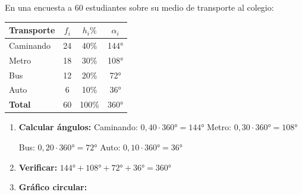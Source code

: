\documentclass[11pt, letterpaper]{article}
\begin{document}
\begin{tcolorbox}[examplebox, title={Ej. 6. Gráfico circular y polígono de frecuencias}]
En una encuesta a 60 estudiantes sobre su medio de transporte al colegio:

\begin{center}
\renewcommand{\arraystretch}{1.3}
\begin{tabular}{l c c c}
\toprule
\textbf{Transporte} & $f_i$ & $h_i\%$ & $\alpha_i$\\
\midrule
Caminando & 24 & 40\% & 144°\\
Metro      & 18 & 30\% & 108°\\
Bus        & 12 & 20\% & 72°\\
Auto       & 6  & 10\% & 36°\\
\midrule
\textbf{Total} & 60 & 100\% & 360°\\
\bottomrule
\end{tabular}
\end{center}

\begin{enumerate}[label=\textbf{\arabic*.}, leftmargin=2.8cm]
  \item[\textbf{Paso 1.}] \textbf{Calcular ángulos:} \quad Caminando: $0{,}40 \cdot 360° = 144°$ \quad Metro: $0{,}30 \cdot 360° = 108°$

  Bus: $0{,}20 \cdot 360° = 72°$ \quad Auto: $0{,}10 \cdot 360° = 36°$

  \medskip
  \item[\textbf{Paso 2.}] \textbf{Verificar:} $144° + 108° + 72° + 36° = 360°$ \checkmark

  \medskip
  \item[\textbf{Paso 3.}] \textbf{Gráfico circular:}
\end{enumerate}


\end{tcolorbox}
\end{document}
